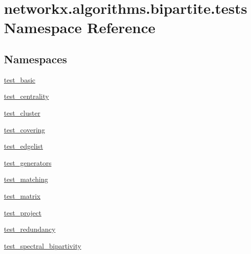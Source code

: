 \hypertarget{namespacenetworkx_1_1algorithms_1_1bipartite_1_1tests}{}\section{networkx.\+algorithms.\+bipartite.\+tests Namespace Reference}
\label{namespacenetworkx_1_1algorithms_1_1bipartite_1_1tests}
\subsection*{Namespaces}
\begin{DoxyCompactItemize}
\item 
 \hyperlink{namespacenetworkx_1_1algorithms_1_1bipartite_1_1tests_1_1test__basic}{test\+\_\+basic}
\item 
 \hyperlink{namespacenetworkx_1_1algorithms_1_1bipartite_1_1tests_1_1test__centrality}{test\+\_\+centrality}
\item 
 \hyperlink{namespacenetworkx_1_1algorithms_1_1bipartite_1_1tests_1_1test__cluster}{test\+\_\+cluster}
\item 
 \hyperlink{namespacenetworkx_1_1algorithms_1_1bipartite_1_1tests_1_1test__covering}{test\+\_\+covering}
\item 
 \hyperlink{namespacenetworkx_1_1algorithms_1_1bipartite_1_1tests_1_1test__edgelist}{test\+\_\+edgelist}
\item 
 \hyperlink{namespacenetworkx_1_1algorithms_1_1bipartite_1_1tests_1_1test__generators}{test\+\_\+generators}
\item 
 \hyperlink{namespacenetworkx_1_1algorithms_1_1bipartite_1_1tests_1_1test__matching}{test\+\_\+matching}
\item 
 \hyperlink{namespacenetworkx_1_1algorithms_1_1bipartite_1_1tests_1_1test__matrix}{test\+\_\+matrix}
\item 
 \hyperlink{namespacenetworkx_1_1algorithms_1_1bipartite_1_1tests_1_1test__project}{test\+\_\+project}
\item 
 \hyperlink{namespacenetworkx_1_1algorithms_1_1bipartite_1_1tests_1_1test__redundancy}{test\+\_\+redundancy}
\item 
 \hyperlink{namespacenetworkx_1_1algorithms_1_1bipartite_1_1tests_1_1test__spectral__bipartivity}{test\+\_\+spectral\+\_\+bipartivity}
\end{DoxyCompactItemize}
